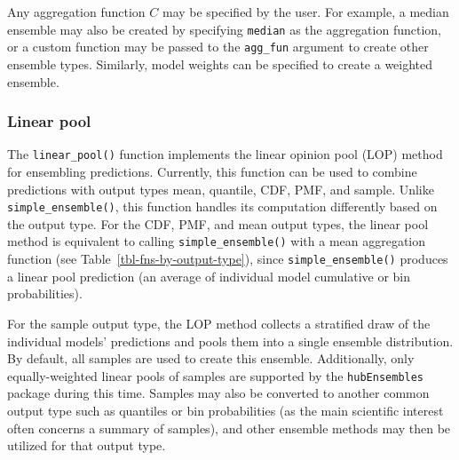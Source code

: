 \documentclass[
  letterpaper,
  DIV=11,
  numbers=noendperiod]{scrartcl}
\begin{document}
Any aggregation function \(C\) may be specified by the user. For
example, a median ensemble may also be created by specifying
\texttt{median} as the aggregation function, or a custom function may be
passed to the \texttt{agg\_fun} argument to create other ensemble types.
Similarly, model weights can be specified to create a weighted ensemble.

\subsubsection{Linear pool}\label{sec-linear-pool}

The \texttt{linear\_pool()} function implements the linear opinion pool
(LOP) method for ensembling predictions. Currently, this function can be
used to combine predictions with output types mean, quantile, CDF, PMF,
and sample. Unlike \texttt{simple\_ensemble()}, this function handles
its computation differently based on the output type. For the CDF, PMF,
and mean output types, the linear pool method is equivalent to calling
\texttt{simple\_ensemble()} with a mean aggregation function (see
Table~\ref{tbl-fns-by-output-type}), since \texttt{simple\_ensemble()}
produces a linear pool prediction (an average of individual model
cumulative or bin probabilities).

For the sample output type, the LOP method collects a stratified draw of
the individual models' predictions and pools them into a single ensemble
distribution. By default, all samples are used to create this ensemble.
Additionally, only equally-weighted linear pools of samples are
supported by the \texttt{hubEnsembles} package during this time. Samples
may also be converted to another common output type such as quantiles or
bin probabilities (as the main scientific interest often concerns a
summary of samples), and other ensemble methods may then be utilized for
that output type.
\end{document}
